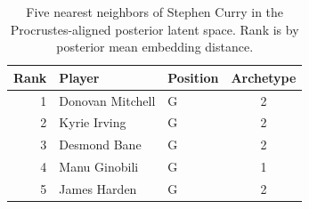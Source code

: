 \begin{table}[htbp]
  \centering\small
  \begin{tabular}{rllc}
    \toprule
    Rank & Player & Position & Archetype \\
    \midrule
    1 & Donovan Mitchell & G & 2 \\
    2 & Kyrie Irving & G & 2 \\
    3 & Desmond Bane & G & 2 \\
    4 & Manu Ginobili & G & 1 \\
    5 & James Harden & G & 2 \\
    \bottomrule
  \end{tabular}
  \caption{Five nearest neighbors of Stephen Curry in the Procrustes-aligned posterior latent space. Rank is by posterior mean embedding distance.}
  \label{tab:Stephen_Curry_neighbors}
\end{table}

